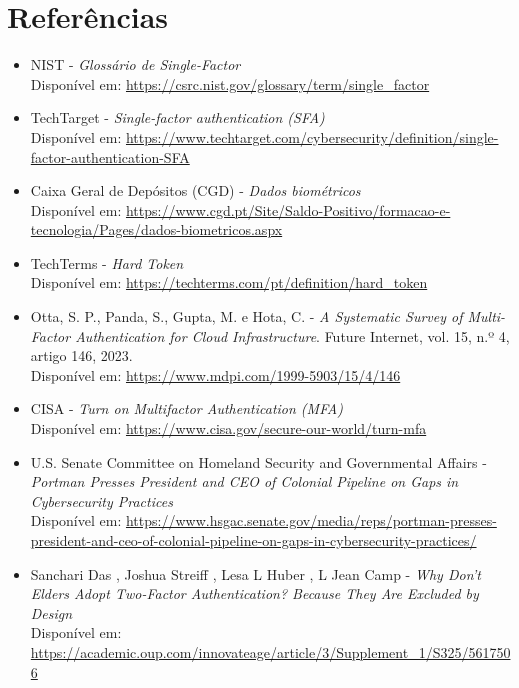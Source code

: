 \section{Referências}

\begin{itemize}

    \item NIST - \textit{Glossário de Single-Factor}\\[0.01cm]
    Disponível em: \url{https://csrc.nist.gov/glossary/term/single_factor}

    \item TechTarget - \textit{Single-factor authentication (SFA)}\\[0.01cm]
    Disponível em: \url{https://www.techtarget.com/cybersecurity/definition/single-factor-authentication-SFA}

    \item Caixa Geral de Depósitos (CGD) - \textit{Dados biométricos}\\[0.01cm]
    Disponível em: \url{https://www.cgd.pt/Site/Saldo-Positivo/formacao-e-tecnologia/Pages/dados-biometricos.aspx}

    \item TechTerms - \textit{Hard Token}\\[0.01cm]
    Disponível em: \url{https://techterms.com/pt/definition/hard_token}

    \item Otta, S. P., Panda, S., Gupta, M. e Hota, C. - 
    \textit{A Systematic Survey of Multi-Factor Authentication for Cloud Infrastructure}.
    Future Internet, vol. 15, n.º 4, artigo 146, 2023.\\[0.01cm]
    Disponível em: \url{https://www.mdpi.com/1999-5903/15/4/146}

     \item CISA - \textit{Turn on Multifactor Authentication (MFA)}\\[0.01cm]
    Disponível em: \url{https://www.cisa.gov/secure-our-world/turn-mfa}

    \item U.S. Senate Committee on Homeland Security and Governmental Affairs - \textit{Portman Presses President and CEO of Colonial Pipeline on Gaps in Cybersecurity Practices}\\[0.01cm]
    Disponível em: \url{https://www.hsgac.senate.gov/media/reps/portman-presses-president-and-ceo-of-colonial-pipeline-on-gaps-in-cybersecurity-practices/}

    \item Sanchari Das , Joshua Streiff , Lesa L Huber , L Jean Camp - \textit{Why Don’t Elders Adopt Two-Factor Authentication? Because They Are Excluded by Design}\\[0.01cm]
    Disponível em: \url{https://academic.oup.com/innovateage/article/3/Supplement_1/S325/5617506}


\end{itemize}
